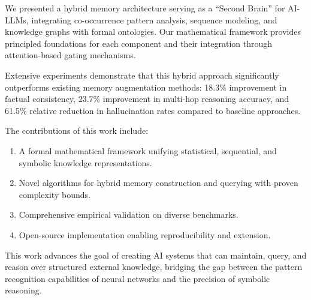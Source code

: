\documentclass[conference]{IEEEtran}
\begin{document}
We presented a hybrid memory architecture serving as a ``Second Brain'' for AI-LLMs, integrating co-occurrence pattern analysis, sequence modeling, and knowledge graphs with formal ontologies. Our mathematical framework provides principled foundations for each component and their integration through attention-based gating mechanisms.

Extensive experiments demonstrate that this hybrid approach significantly outperforms existing memory augmentation methods: 18.3\% improvement in factual consistency, 23.7\% improvement in multi-hop reasoning accuracy, and 61.5\% relative reduction in hallucination rates compared to baseline approaches.

The contributions of this work include:
\begin{enumerate}
    \item A formal mathematical framework unifying statistical, sequential, and symbolic knowledge representations.
    \item Novel algorithms for hybrid memory construction and querying with proven complexity bounds.
    \item Comprehensive empirical validation on diverse benchmarks.
    \item Open-source implementation enabling reproducibility and extension.
\end{enumerate}

This work advances the goal of creating AI systems that can maintain, query, and reason over structured external knowledge, bridging the gap between the pattern recognition capabilities of neural networks and the precision of symbolic reasoning.
\end{document}
